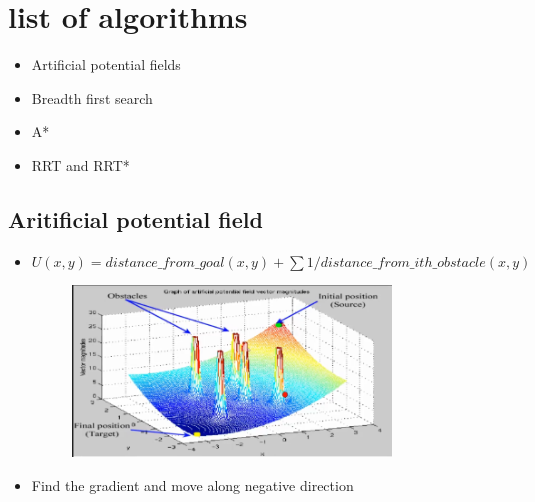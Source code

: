 \documentclass[a4paper]{article}
\begin{document}
\section{list of algorithms}
\begin{itemize}
    \item Artificial potential fields
    \item Breadth first search 
    \item A* 
    \item RRT and RRT*
\end{itemize}
\subsection{Aritificial potential field}
\begin{itemize}
    \item $
        U(x,y) = distance\_from\_goal(x,y)  + \sum 1/distance\_from\_ith\_obstacle(x,y)
        $ 
    \begin{figure}[htpb]
                          \centering
                          \includegraphics[width=0.8\textwidth]{field_vector_graph.png}
                          \caption{}
                          \label{fig:}
                      \end{figure}
    \item Find the gradient and move along negative direction
\end{itemize}
\end{document}
